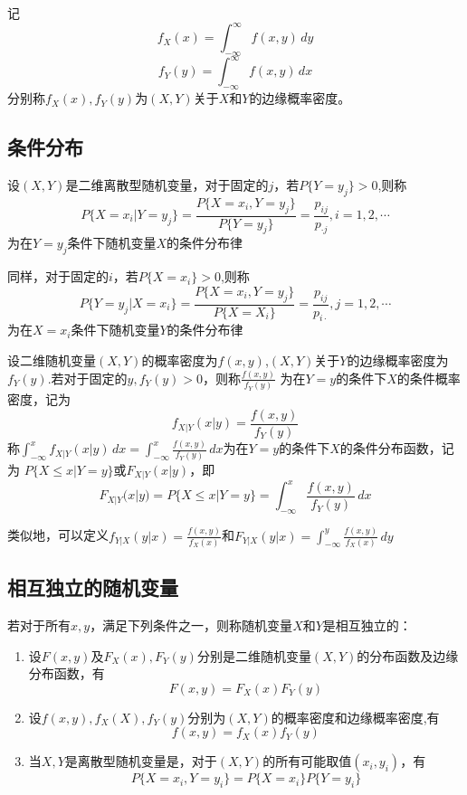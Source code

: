 \begin{definition}[边缘概率密度]
    记
    $$f_X(x)=\int_{-\infty}^{\infty}f(x,y)\,dy$$
    $$f_Y(y)=\int_{-\infty}^{\infty}f(x,y)\,dx$$
    分别称$f_X(x),f_Y(y)$为$(X,Y)$关于$X$和$Y$的边缘概率密度。
\end{definition}

\subsection{条件分布}
\begin{definition}[条件分布律]
    设$(X,Y)$是二维离散型随机变量，对于固定的$j$，若$P\{Y=y_j\}>0$,则称
    $$P\{X=x_i|Y=y_j\}=\frac{P\{X=x_i,Y=y_j\}}{P\{Y=y_j\}}=\frac{p_{ij}}{p_{\cdot j}},i=1,2,\cdots$$
    为在$Y=y_j$条件下随机变量$X$的条件分布律

    同样，对于固定的$i$，若$P\{X=x_i\}>0$,则称
    $$P\{Y=y_j|X=x_i\}=\frac{P\{X=x_i,Y=y_j\}}{P\{X=X_i\}}=\frac{p_{ij}}{p_{i\cdot }},j=1,2,\cdots$$
    为在$X=x_i$条件下随机变量$Y$的条件分布律
\end{definition}

\begin{definition}[条件概率密度]
    设二维随机变量$(X,Y)$的概率密度为$f(x,y)$,$(X,Y)$关于$Y$的边缘概率密度为$f_Y(y)$.若对于固定的$y,f_Y(y)>0$，则称$\frac{f(x,y)}{f_Y(y)}$
    为在$Y=y$的条件下$X$的条件概率密度，记为
    $$f_{X|Y}(x|y)=\frac{f(x,y)}{f_Y(y)}$$
    称$\displaystyle{\int_{-\infty}^x f_{X|Y}(x|y)\,dx=\int_{-\infty}^x \frac{f(x,y)}{f_Y(y)}\,dx}$为在$Y=y$的条件下$X$的条件分布函数，记为
    $P\{X\leq x|Y=y\}$或$F_{X|Y}(x|y)$，即
    $$F_{X|Y}(x|y)=P\{X\leq x|Y=y\}=\int_{-\infty}^x \frac{f(x,y)}{f_Y(y)}\,dx$$

    类似地，可以定义$\displaystyle{f_{Y|X}(y|x)=\frac{f(x,y)}{f_X(x)}}$和$\displaystyle{F_{Y|X}(y|x)=\int_{-\infty}^y \frac{f(x,y)}{f_X(x)}\,dy}$
\end{definition}

\subsection{相互独立的随机变量}
\begin{definition}[相互独立]
    若对于所有$x,y$，满足下列条件之一，则称随机变量$X$和$Y$是相互独立的：
    \begin{enumerate}
        \item 设$F(x,y)$及$F_X(x),F_Y(y)$分别是二维随机变量$(X,Y)$的分布函数及边缘分布函数，有
                $$F(x,y)=F_X(x)F_Y(y)$$
        \item 设$f(x,y),f_X(X),f_Y(y)$分别为$(X,Y)$的概率密度和边缘概率密度,有
                $$f(x,y)=f_X(x)f_Y(y)$$
        \item 当$X,Y$是离散型随机变量是，对于$(X,Y)$的所有可能取值$(x_i,y_i)$，有
                $$P\{X=x_i,Y=y_i\}=P\{X=x_i\}P\{Y=y_i\}$$
    \end{enumerate}
\end{definition}

